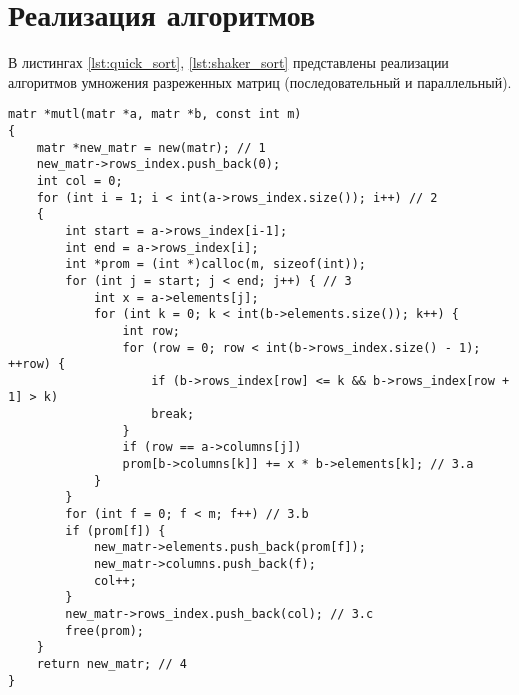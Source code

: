 \section{Реализация алгоритмов}
В листингах \ref{lst:quick_sort}, \ref{lst:shaker_sort} представлены реализации алгоритмов умножения разреженных матриц (последовательный и параллельный).

\begin{lstlisting}[label=lst:quick_sort,caption=Реализация последовательного алгоритма умножения разреженных матриц]
matr *mutl(matr *a, matr *b, const int m)
{
	matr *new_matr = new(matr); // 1
	new_matr->rows_index.push_back(0);
	int col = 0;
	for (int i = 1; i < int(a->rows_index.size()); i++) // 2
	{
		int start = a->rows_index[i-1];
		int end = a->rows_index[i];
		int *prom = (int *)calloc(m, sizeof(int));
		for (int j = start; j < end; j++) { // 3
			int x = a->elements[j];
			for (int k = 0; k < int(b->elements.size()); k++) {
				int row;
				for (row = 0; row < int(b->rows_index.size() - 1); ++row) {
					if (b->rows_index[row] <= k && b->rows_index[row + 1] > k)
					break;
				}
				if (row == a->columns[j])
				prom[b->columns[k]] += x * b->elements[k]; // 3.a
			}
		}
		for (int f = 0; f < m; f++) // 3.b
		if (prom[f]) {
			new_matr->elements.push_back(prom[f]);
			new_matr->columns.push_back(f);
			col++;
		}
		new_matr->rows_index.push_back(col); // 3.c
		free(prom);
	}
	return new_matr; // 4
}
\end{lstlisting}


